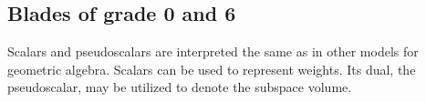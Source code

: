 \subsection{Blades of grade 0 and 6}

Scalars and pseudoscalars are interpreted the same as in other models for geometric algebra.  Scalars can be used to represent weights.  Its dual, the pseudoscalar, may be utilized to denote the subspace volume.

